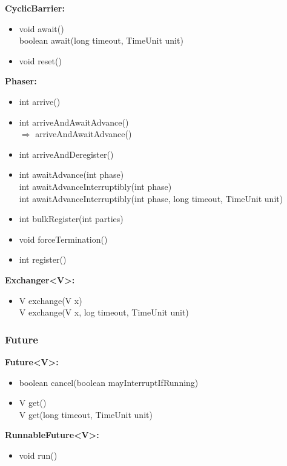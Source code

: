 \documentclass[]{usiinfthesis}
\begin{document}
{\noindent
\textbf{CyclicBarrier:}
\begin{itemize}
    \item   void await()
    \mbox{}\\ boolean await(long timeout, TimeUnit unit)
    \item   void reset()
\end{itemize}

\noindent
\textbf{Phaser:}
\begin{itemize}
    \item   int arrive()
    \item   int arriveAndAwaitAdvance()
    \mbox{}\\ $\Rightarrow$ arriveAndAwaitAdvance()			
    \item   int arriveAndDeregister()
    \item   int awaitAdvance(int phase)
    \mbox{}\\ int awaitAdvanceInterruptibly(int phase)
    \mbox{}\\ int awaitAdvanceInterruptibly(int phase, long timeout, TimeUnit unit)
    \item   int bulkRegister(int parties)
    \item   void forceTermination()
    \item   int register()
\end{itemize}

\noindent
\textbf{Exchanger<V>:}
\begin{itemize}
    \item   V exchange(V x)
    \mbox{}\\ V exchange(V x, log timeout, TimeUnit unit)
\end{itemize}


\subsubsection{Future}

\noindent
\textbf{Future<V>:}
\begin{itemize}
    \item   boolean cancel(boolean mayInterruptIfRunning)
    \item   V get()
    \mbox{}\\ V get(long timeout, TimeUnit unit)
\end{itemize}

\noindent
\textbf{RunnableFuture<V>:}
\begin{itemize}
    \item   void run()
\end{itemize}

}
\end{document}
